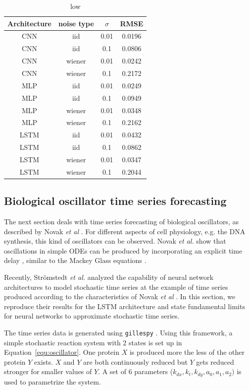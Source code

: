 \documentclass{article}
\begin{document}
\begin{table} 
  \centering  
  \begin{tabular}{c|c|c|c}
    Architecture & noise type & $\sigma$ & RMSE \\
    \hline
    CNN & iid & 0.01 & 0.0196 \\
    CNN & iid & 0.1 & 0.0806 \\ 
    CNN & wiener & 0.01 & 0.0242 \\
    CNN & wiener & 0.1 & 0.2172 \\
    MLP & iid & 0.01 & 0.0249 \\
    MLP & iid & 0.1 & 0.0949 \\
    MLP & wiener & 0.01 & 0.0348 \\
    MLP & wiener & 0.1 & 0.2162 \\
    LSTM & iid & 0.01 & 0.0432 \\
    LSTM & iid & 0.1 & 0.0862 \\
    LSTM & wiener & 0.01 & 0.0347 \\
    LSTM & wiener & 0.1 & 0.2044 \\
  \end{tabular}
  \caption{low}
  \label{tab:mackey_noise}
\end{table}

\subsection{Biological oscillator time series forecasting}

The next section deals with time series forecasting of biological oscillators,
as described by Novak \textit{et al} \cite{novak2008}. For different aspects of
cell physiology, e.g. the DNA synthesis, this kind of oscillators can be
observed. Novak \textit{et al.} show that oscillations in simple ODEs can be
produced by incorporating an explicit time delay \cite{novak2008}, similar to
the Mackey Glass equations \cite{mackey1977}.

Recently, Strömstedt \textit{et al.} analyzed the capability of neural network
architectures to model stochastic time series \cite{stroemstedt2018} at the
example of time series produced according to the characteristics of Novak
\textit{et al} \cite{novak2008}. In this section, we reproduce their results for
the LSTM architecture and state fundamental limits for neural networks to
approximate stochastic time series.

The time series data is generated using \texttt{gillespy} \cite{abel2016}.
Using this framework, a simple stochastic reaction system with 2 states is
set up in Equation~\ref{equ:oscillator}.
One protein $X$ is produced more the less of the other protein $Y$
exists. $X$ and $Y$ are both continuously reduced but $Y$ gets reduced stronger
for smaller values of $Y$. A set of 6 parameters 
($k_{dx}, k_t, k_{dy}, a_0, a_1, a_2)$ 
is used to parametrize the system.
\end{document}
